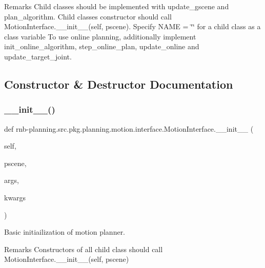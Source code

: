 \begin{DoxyRemark}{Remarks}
Child classes should be implemented with update\+\_\+gscene and plan\+\_\+algorithm. Child classes\textquotesingle{} constructor should call Motion\+Interface.\+\_\+\+\_\+init\+\_\+\+\_\+(self, pscene). Specify N\+A\+ME = \char`\"{}\char`\"{} for a child class as a class variable To use online planning, additionally implement init\+\_\+online\+\_\+algorithm, step\+\_\+online\+\_\+plan, update\+\_\+online and update\+\_\+target\+\_\+joint. 
\end{DoxyRemark}


\subsection{Constructor \& Destructor Documentation}
\mbox{\label{classrnb-planning_1_1src_1_1pkg_1_1planning_1_1motion_1_1interface_1_1_motion_interface_ab6c7209a8131ee6b4e95b07339f9ffb6}} 
\subsubsection{\texorpdfstring{\+\_\+\+\_\+init\+\_\+\+\_\+()}{\_\_init\_\_()}}
{\footnotesize\ttfamily def rnb-\/planning.\+src.\+pkg.\+planning.\+motion.\+interface.\+Motion\+Interface.\+\_\+\+\_\+init\+\_\+\+\_\+ (\begin{DoxyParamCaption}\item[{}]{self,  }\item[{}]{pscene,  }\item[{}]{args,  }\item[{}]{kwargs }\end{DoxyParamCaption})}



Basic initiailization of motion planner. 

\begin{DoxyRemark}{Remarks}
Constructors of all child class should call Motion\+Interface.\+\_\+\+\_\+init\+\_\+\+\_\+(self, pscene) 
\end{DoxyRemark}

